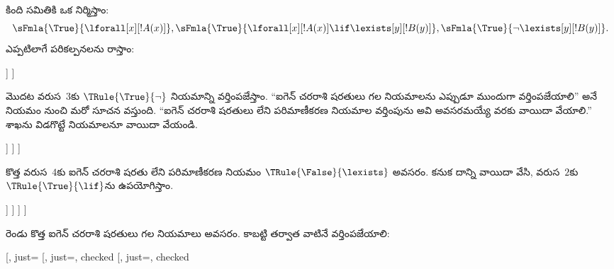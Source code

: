\documentclass[../../../include/open-logic-section]{subfiles}
\begin{document}
\begin{ex}
కింది సమితికి ఒక  నిర్మిస్తాం:
\[
\sFmla{\True}{\lforall[x][!A(x)]}, \sFmla{\True}{\lforall[x][!A(x)]
  \lif \lexists[y][!B(y)]}, \sFmla{\True}{\lnot\lexists[y][!B(y)]}.
\]
ఎప్పటిలాగే పరికల్పనలను రాస్తాం:
\begin{oltableau}
  [\sFmla{\True}{\lforall[x][\formula{A}(x)]}, just=\TAss
    [\sFmla{\True}{\lforall[x][\formula{A}(x)] \lif
        \lexists[y][\formula{B}(y)]}, just=\TAss
      [\sFmla{\True}{\lnot\lexists[y][\formula{B}(y)]}, just=\TAss
      ]
    ]
  ]
\end{oltableau}
మొదట వరుస~$3$కు $\TRule{\True}{\lnot}$ నియమాన్ని వర్తింపజేస్తాం.
“ఐగెన్ చరరాశి షరతులు గల నియమాలను ఎప్పుడూ ముందుగా వర్తింపజేయాలి”
అనే నియమం నుంచి మరో సూచన వస్తుంది. “ఐగెన్ చరరాశి షరతులు లేని పరిమాణీకరణ
నియమాల వర్తింపును అవి అవసరమయ్యే వరకు వాయిదా వేయాలి.” శాఖను విడగొట్టే నియమాలనూ
వాయిదా వేయండి.
\begin{oltableau}
  [\sFmla{\True}{\lforall[x][\formula{A}(x)]}, just=\TAss
    [\sFmla{\True}{\lforall[x][\formula{A}(x)] \lif
        \lexists[y][\formula{B}(y)]}, just=\TAss
      [\sFmla{\True}{\lnot\lexists[y][\formula{B}(y)]}, just=\TAss, checked
        [\sFmla{\False}{\lexists[y][\formula{B}(y)]}, just={\TRule{\True}{\lnot}[3]}]
      ]
    ]
  ]
\end{oltableau}
కొత్త వరుస~$4$కు ఐగెన్ చరరాశి షరతు లేని పరిమాణీకరణ నియమం
$\TRule{\False}{\lexists}$ అవసరం. కనుక దాన్ని వాయిదా వేసి,
వరుస~$2$కు $\TRule{\True}{\lif}$ను ఉపయోగిస్తాం.
\begin{oltableau}
  [\sFmla{\True}{\lforall[x][\formula{A}(x)]}, just=\TAss
    [\sFmla{\True}{\lforall[x][\formula{A}(x)] \lif
        \lexists[y][\formula{B}(y)]}, just=\TAss, checked
      [\sFmla{\True}{\lnot\lexists[y][\formula{B}(y)]}, just=\TAss, checked
        [\sFmla{\False}{\lexists[y][\formula{B}(y)]},
          just={\TRule{\True}{\lnot}[3]},
          [\sFmla{\False}{\lforall[x][\formula{A}(x)]}, just={\TRule{\True}{\lif}[2]}]
          [\sFmla{\True}{\lexists[y][\formula{B}(y)]}, just={\TRule{\True}{\lif}[2]}]
        ]
      ]
    ]
  ]
\end{oltableau}
రెండు కొత్త  ఐగెన్ చరరాశి షరతులు గల నియమాలు
అవసరం. కాబట్టి తర్వాత వాటినే వర్తింపజేయాలి:
\begin{oltableau}
  [\sFmla{\True}{\lforall[x][\formula{A}(x)]}, just=\TAss
    [\sFmla{\True}{\lforall[x][\formula{A}(x)] \lif
        \lexists[y][\formula{B}(y)]}, just=\TAss, checked
      [\sFmla{\True}{\lnot\lexists[y][\formula{B}(y)]}, just=\TAss, checked

\end{oltableau}
\end{ex}
\end{document}
